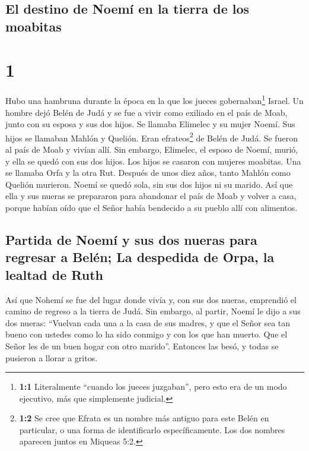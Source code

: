 \hypertarget{el-destino-de-noemuxed-en-la-tierra-de-los-moabitas}{%
\subsection{El destino de Noemí en la tierra de los
moabitas}\label{el-destino-de-noemuxed-en-la-tierra-de-los-moabitas}}

\hypertarget{section}{%
\section{1}\label{section}}

 Hubo una hambruna durante la época en la que los jueces
gobernaban\footnote{\textbf{1:1} Literalmente ``cuando los jueces
  juzgaban'', pero esto era de un modo ejecutivo, más que simplemente
  judicial.} Israel. Un hombre dejó Belén de Judá y se fue a vivir como
exiliado en el país de Moab, junto con su esposa y sus dos hijos.
 Se llamaba Elimelec y su mujer Noemí. Sus hijos se
llamaban Mahlón y Quelión. Eran efrateos\footnote{\textbf{1:2} Se cree
  que Efrata es un nombre más antiguo para este Belén en particular, o
  una forma de identificarlo específicamente. Los dos nombres aparecen
  juntos en Miqueas 5:2.} de Belén de Judá. Se fueron al país de Moab y
vivían allí.  Sin embargo, Elimelec, el esposo de Noemí,
murió, y ella se quedó con sus dos hijos.  Los hijos se
casaron con mujeres moabitas. Una se llamaba Orfa y la otra Rut. Después
de unos diez años,  tanto Mahlón como Quelión murieron.
Noemí se quedó sola, sin sus dos hijos ni su marido.  Así
que ella y sus nueras se prepararon para abandonar el país de Moab y
volver a casa, porque habían oído que el Señor había bendecido a su
pueblo allí con alimentos.

\hypertarget{partida-de-noemuxed-y-sus-dos-nueras-para-regresar-a-beluxe9n-la-despedida-de-orpa-la-lealtad-de-ruth}{%
\subsection{Partida de Noemí y sus dos nueras para regresar a Belén; La
despedida de Orpa, la lealtad de
Ruth}\label{partida-de-noemuxed-y-sus-dos-nueras-para-regresar-a-beluxe9n-la-despedida-de-orpa-la-lealtad-de-ruth}}

 Así que Nohemí se fue del lugar donde vivía y, con sus
dos nueras, emprendió el camino de regreso a la tierra de Judá.
 Sin embargo, al partir, Noemí le dijo a sus dos nueras:
``Vuelvan cada una a la casa de sus madres, y que el Señor sea tan bueno
con ustedes como lo ha sido conmigo y con los que han muerto.
 Que el Señor les de un buen hogar con otro marido''.
Entonces las besó, y todas se pusieron a llorar a gritos.

